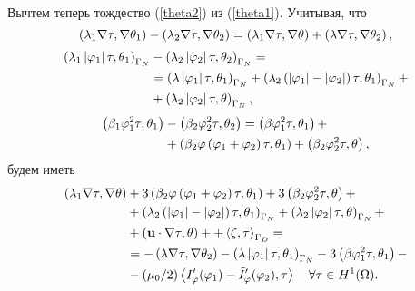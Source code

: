 Вычтем теперь тождество (\ref{theta2}) из (\ref{theta1}). Учитывая, что
\[
    \left( \lambda_1 \nabla \tau, \nabla \theta_1 \right) - 
    \left( \lambda_2 \nabla \tau, \nabla \theta_2 \right) = 
    \left( \lambda_1 \nabla \tau, \nabla \theta \right) + 
    \left( \lambda \nabla \tau, \nabla \theta_2 \right),
\]
\[
    \begin{split}
        \left( \lambda_1 \left\vert \varphi_1 \right\vert \tau, \theta_1 \right)_{\Gamma_N} 
        &- \left( \lambda_2 \left\vert \varphi_2 \right\vert \tau, \theta_2 \right)_{\Gamma_N} = \\
        &= \left( \lambda \left\vert \varphi_1 \right\vert \tau, \theta_1 \right)_{\Gamma_N} 
        + \left( \lambda_2 
            \left( 
                \left\vert \varphi_1 \right\vert - \left\vert \varphi_2 \right\vert
             \right) \tau, \theta_1
         \right)_{\Gamma_N} + \\ 
        &+ \left( \lambda_2 \left\vert \varphi_2 \right\vert \tau, \theta \right)_{\Gamma_N},
    \end{split}
\]
\[
    \begin{split}
        \left( \beta_1 \varphi_1^2 \tau, \theta_1 \right) 
        &- \left( \beta_2 \varphi_2^2 \tau, \theta_2 \right)
        = \left( \beta \varphi_1^2 \tau, \theta_1 \right) + \\
        &+ \left( \beta_2 \varphi \left( \varphi_1 + \varphi_2 \right) \tau, \theta_1 \right)
        + \left( \beta_2 \varphi_2^2 \tau, \theta \right),
    \end{split}
\]
будем иметь
\begin{equation}
    \label{thetaminus}
    \begin{split}
        \left( \lambda_1 \nabla \tau, \nabla \theta \right) 
        &+ 3 \left( \beta_2 \varphi \left( \varphi_1 + \varphi_2 \right) \tau, \theta_1 \right)
        + 3 \left( \beta_2 \varphi_2^2 \tau, \theta \right) + \\
        &+ \left( 
            \lambda_2 \left( \left\vert \varphi_1 \right\vert - \left\vert \varphi_2 \right\vert \right) \tau, \theta_1
         \right)_{\Gamma_N} 
        + \left( \lambda_2 \left\vert \varphi_2 \right\vert \tau, \theta \right)_{\Gamma_N} + \\ 
        &+ \left( \mathbf{u} \cdot \nabla \tau, \theta \right) +
        + \left\langle \zeta, \tau \right\rangle_{\Gamma_D} = \\
        &= - \left( \lambda \nabla \tau, \nabla \theta_2 \right) 
        - \left( \lambda \left\vert \varphi_1 \right\vert \tau, \theta_1 \right)_{\Gamma_N}
        - 3 \left( \beta \varphi_1^2 \tau, \theta_1 \right) - \\
        &- (\mu_0 / 2) \left\langle I_\varphi' (\varphi_1) - \tilde I_\varphi' (\varphi_2) ,\tau \right\rangle 
        \quad \forall \tau \in H^1 (\Omega).
    \end{split}
\end{equation}

